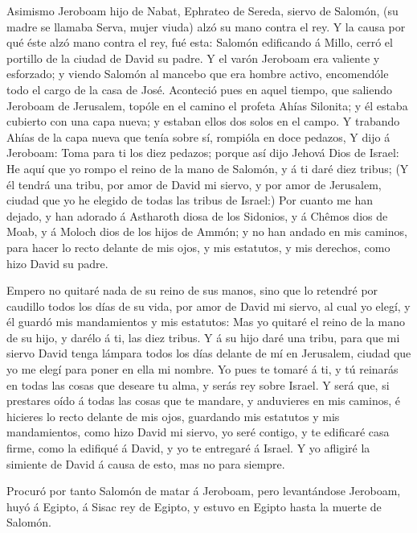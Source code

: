  Asimismo Jeroboam hijo de Nabat, Ephrateo de Sereda,
siervo de Salomón, (su madre se llamaba Serva, mujer viuda) alzó su mano
contra el rey.  Y la causa por qué éste alzó mano contra el
rey, fué esta: Salomón edificando á Millo, cerró el portillo de la
ciudad de David su padre.  Y el varón Jeroboam era valiente
y esforzado; y viendo Salomón al mancebo que era hombre activo,
encomendóle todo el cargo de la casa de José.  Aconteció
pues en aquel tiempo, que saliendo Jeroboam de Jerusalem, topóle en el
camino el profeta Ahías Silonita; y él estaba cubierto con una capa
nueva; y estaban ellos dos solos en el campo.  Y trabando
Ahías de la capa nueva que tenía sobre sí, rompióla en doce pedazos,
 Y dijo á Jeroboam: Toma para ti los diez pedazos; porque
así dijo Jehová Dios de Israel: He aquí que yo rompo el reino de la mano
de Salomón, y á ti daré diez tribus;  (Y él tendrá una
tribu, por amor de David mi siervo, y por amor de Jerusalem, ciudad que
yo he elegido de todas las tribus de Israel:)  Por cuanto
me han dejado, y han adorado á Astharoth diosa de los Sidonios, y á
Chêmos dios de Moab, y á Moloch dios de los hijos de Ammón; y no han
andado en mis caminos, para hacer lo recto delante de mis ojos, y mis
estatutos, y mis derechos, como hizo David su padre.

 Empero no quitaré nada de su reino de sus manos, sino que
lo retendré por caudillo todos los días de su vida, por amor de David mi
siervo, al cual yo elegí, y él guardó mis mandamientos y mis estatutos:
 Mas yo quitaré el reino de la mano de su hijo, y darélo á
ti, las diez tribus.  Y á su hijo daré una tribu, para que
mi siervo David tenga lámpara todos los días delante de mí en Jerusalem,
ciudad que yo me elegí para poner en ella mi nombre.  Yo
pues te tomaré á ti, y tú reinarás en todas las cosas que deseare tu
alma, y serás rey sobre Israel.  Y será que, si prestares
oído á todas las cosas que te mandare, y anduvieres en mis caminos, é
hicieres lo recto delante de mis ojos, guardando mis estatutos y mis
mandamientos, como hizo David mi siervo, yo seré contigo, y te edificaré
casa firme, como la edifiqué á David, y yo te entregaré á Israel.
 Y yo afligiré la simiente de David á causa de esto, mas no
para siempre.

 Procuró por tanto Salomón de matar á Jeroboam, pero
levantándose Jeroboam, huyó á Egipto, á Sisac rey de Egipto, y estuvo en
Egipto hasta la muerte de Salomón.

